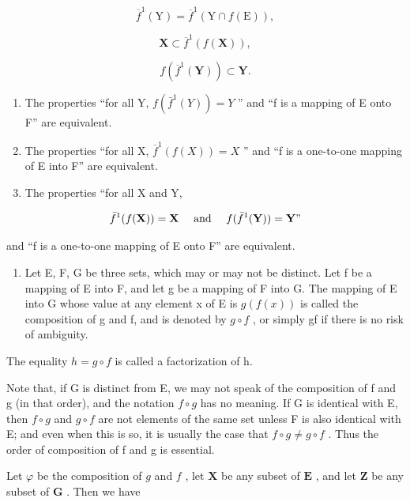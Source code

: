 \[
\overline {{{f}}} ^ {1} (\mathrm{Y}) = \overline {{{f}}} ^ {1} (\mathrm{Y} \cap f (\mathrm{E})),\tag{18}
\]

\[
\mathbf {X} \subset \overline {{f}} ^ {1} (f (\mathbf {X})),\tag{19}
\]

\[
f (\overline {{f}} ^ {1} (\mathbf {Y})) \subset \mathbf {Y}.
\]

\begin{enumerate}
\def\labelenumi{(\alph{enumi})}
\setcounter{enumi}{1}
\item
  The properties ``for all Y, \(f(\bar{f}^{1}(Y)) = Y\) '' and ``f is a mapping of E onto F'' are equivalent.
\item
  The properties ``for all X, \(\overline{f}^{1}(f(X)) = X\) '' and ``f is a one-to-one mapping of E into F'' are equivalent.
\item
  The properties ``for all X and Y,
\end{enumerate}

\[
\bar {f} ^ {1} (f (\mathbf {X})) = \mathbf {X} \quad \text { and } \quad f (\bar {f} ^ {1} (\mathbf {Y})) = \mathbf {Y}"
\]

and ``f is a one-to-one mapping of E onto F'' are equivalent.

\begin{enumerate}
\def\labelenumi{\arabic{enumi}.}
\setcounter{enumi}{10}
\tightlist
\item
  Let E, F, G be three sets, which may or may not be distinct. Let f be a mapping of E into F, and let g be a mapping of F into G. The mapping of E into G whose value at any element x of E is \(g(f(x))\) is called the composition of g and f, and is denoted by \(g \circ f\) , or simply gf if there is no risk of ambiguity.
\end{enumerate}

The equality \(h = g \circ f\) is called a factorization of h.

Note that, if G is distinct from E, we may not speak of the composition of f and g (in that order), and the notation \(f \circ g\) has no meaning. If G is identical with E, then \(f \circ g\) and \(g \circ f\) are not elements of the same set unless F is also identical with E; and even when this is so, it is usually the case that \(f \circ g \neq g \circ f\) . Thus the order of composition of f and g is essential.

Let \(\varphi\) be the composition of \(g\) and \(f\) , let \(\mathbf{X}\) be any subset of \(\mathbf{E}\) , and let \(\mathbf{Z}\) be any subset of \(\mathbf{G}\) . Then we have

